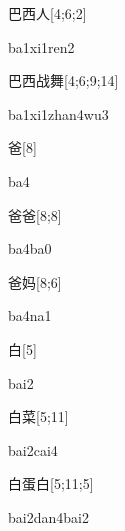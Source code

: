 \begin{verbete}[ba1xi1ren2]{巴西人}[4;6;2]
\begin{pronuncia}{ba1xi1ren2}
\end{pronuncia}
\end{verbete}

\begin{verbete}[ba1xi1zhan4wu3]{巴西战舞}[4;6;9;14]
\begin{pronuncia}[\\]{ba1xi1zhan4wu3}
\end{pronuncia}
\end{verbete}

\begin{verbete}[ba4]{爸}[8]
\begin{pronuncia}{ba4}
\end{pronuncia}
\end{verbete}

\begin{verbete}[ba4ba0]{爸爸}[8;8]
\begin{pronuncia}{ba4ba0}
\end{pronuncia}
\end{verbete}

\begin{verbete}[ba4ma1]{爸妈}[8;6]
\begin{pronuncia}{ba4na1}
\end{pronuncia}
\end{verbete}

\begin{verbete}[bai2]{白}[5]
\begin{pronuncia}{bai2}
\end{pronuncia}
\end{verbete}

\begin{verbete}{白菜}[5;11]
\begin{pronuncia}{bai2cai4}
\end{pronuncia}
\end{verbete}

\begin{verbete}{白蛋白}[5;11;5]
\begin{pronuncia}{bai2dan4bai2}
\end{pronuncia}
\end{verbete}


